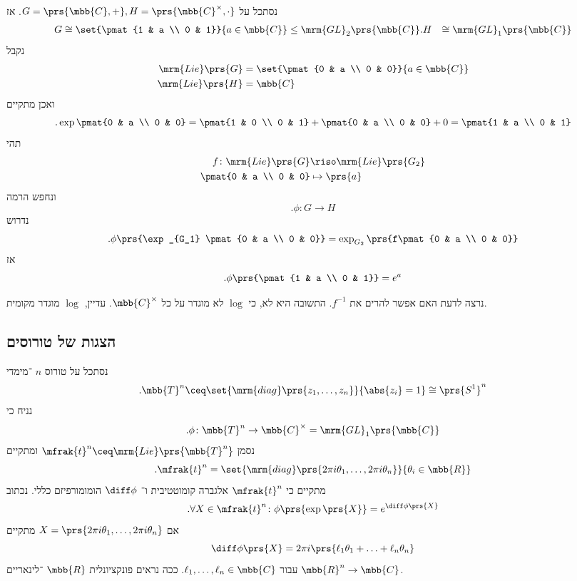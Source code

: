 \documentclass[10pt, twoside]{book}
\newcommand{\Lie}{\mrm{Lie}}
\begin{document}
\begin{example}
נסתכל על
$G = \prs{\mbb{C}, +}, H = \prs{\mbb{C}^\times, \cdot}$.
אז
\begin{align*}
G &\cong \set{\pmat{1 & a \\ 0 & 1}}{a \in \mbb{C}} \leq \mrm{GL}_2\prs{\mbb{C}}
\text{.} H &\cong \mrm{GL}_1\prs{\mbb{C}}
\end{align*}
נקבל
\begin{align*}
\Lie\prs{G} &= \set{\pmat{0 & a \\ 0 & 0}}{a \in \mbb{C}} \\
\Lie\prs{H} &= \mbb{C}
\end{align*}
ואכן מתקיים
\[\text{.}\exp\pmat{0 & a \\ 0 & 0} = \pmat{1 & 0 \\ 0 & 1} + \pmat{0 & a \\ 0 & 0} + 0 = \pmat{1 & a \\ 0 & 1}\]
תהי
\begin{align*}
f \colon \Lie\prs{G} &\riso \Lie\prs{G_2} \\
\pmat{0 & a \\ 0 & 0} &\mapsto \prs{a}
\end{align*}
ונחפש הרמה
\[\text{.} \phi \colon G \to H\]
נדרוש
\[\text{.} \phi\prs{\exp_{G_1} \pmat{0 & a \\ 0 & 0}} = \exp_{G_2}\prs{f\pmat{0 & a \\ 0 & 0}}\]
אז
\[\text{.} \phi\prs{\pmat{1 & a \\ 0 & 1}} = e^a\]

נרצה לדעת האם אפשר להרים את
$f^{-1}$.
התשובה היא לא, כי
$\log$
לא מוגדר על כל
$\mbb{C}^\times$.
עדיין,
$\log$
מוגדר מקומית.
\end{example}

\subsection{הצגות של טורוסים}

נסתכל על טורוס
$n$%
־מימדי
\[\text{.} \mbb{T}^n \ceq \set{\mrm{diag}\prs{z_1, \ldots, z_n}}{\abs{z_i} = 1} \cong \prs{S^1}^n\]
נניח כי
\[\text{.} \phi \colon \mbb{T}^n \to \mbb{C}^\times = \mrm{GL}_1\prs{\mbb{C}}\]
נסמן
$\mfrak{t}^n \ceq \Lie\prs{\mbb{T}^n}$
ומתקיים
\[\text{.} \mfrak{t}^n = \set{\mrm{diag}\prs{2 \pi i \theta_1, \ldots, 2 \pi i \theta_n}}{\theta_i \in \mbb{R}}\]
מתקיים כי
$\mfrak{t}^n$
אלגברה קומוטטיבית ו־%
$\diff \phi$
הומומורפיזם כללי.
נכתוב
\[\text{.} \forall X \in \mfrak{t}^n \colon \phi\prs{\exp\prs{X}} = e^{\diff \phi\prs{X}}\]
אם
$X = \prs{2 \pi i \theta_1, \ldots, 2 \pi i \theta_n}$
מתקיים
\[\diff \phi\prs{X} = 2 \pi i \prs{\ell_1 \theta_1 + \ldots + \ell_n \theta_n}\]
עבור
$\ell_1,\ldots, \ell_n \in \mbb{C}$.
ככה נראים פונקציונלית
$\mbb{R}$%
־לינאריים
$\mbb{R}^n \to \mbb{C}$.
\end{document}

